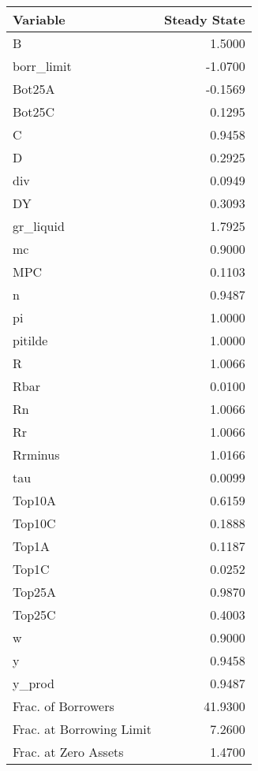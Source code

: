 \begin{table}
\centering
\label{tab:stst}
\begin{tabular}{lr}
\toprule
                Variable &  Steady State \\
\midrule
                       B &        1.5000 \\
              borr\_limit &       -1.0700 \\
                  Bot25A &       -0.1569 \\
                  Bot25C &        0.1295 \\
                       C &        0.9458 \\
                       D &        0.2925 \\
                     div &        0.0949 \\
                      DY &        0.3093 \\
               gr\_liquid &        1.7925 \\
                      mc &        0.9000 \\
                     MPC &        0.1103 \\
                       n &        0.9487 \\
                      pi &        1.0000 \\
                 pitilde &        1.0000 \\
                       R &        1.0066 \\
                    Rbar &        0.0100 \\
                      Rn &        1.0066 \\
                      Rr &        1.0066 \\
                 Rrminus &        1.0166 \\
                     tau &        0.0099 \\
                  Top10A &        0.6159 \\
                  Top10C &        0.1888 \\
                   Top1A &        0.1187 \\
                   Top1C &        0.0252 \\
                  Top25A &        0.9870 \\
                  Top25C &        0.4003 \\
                       w &        0.9000 \\
                       y &        0.9458 \\
                  y\_prod &        0.9487 \\
      Frac. of Borrowers &       41.9300 \\
Frac. at Borrowing Limit &        7.2600 \\
    Frac. at Zero Assets &        1.4700 \\
\bottomrule
\end{tabular}
\end{table}
